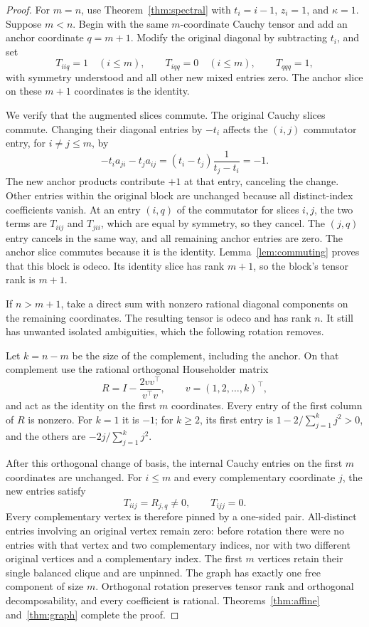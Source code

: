 \begin{proof}
For $m=n$, use Theorem~\ref{thm:spectral} with $t_i=i-1$, $z_i=1$, and $\kappa=1$. Suppose $m<n$. Begin with the same $m$-coordinate Cauchy tensor and add an anchor coordinate $q=m+1$. Modify the original diagonal by subtracting $t_i$, and set
\begin{equation}\label{eq:anchor}
 T_{iiq}=1\quad(i\le m),\qquad T_{iqq}=0\quad(i\le m),\qquad
 T_{qqq}=1,
\end{equation}
with symmetry understood and all other new mixed entries zero. The anchor slice on these $m+1$ coordinates is the identity.

We verify that the augmented slices commute. The original Cauchy slices commute. Changing their diagonal entries by $-t_i$ affects the $(i,j)$ commutator entry, for $i\ne j\le m$, by
\[
 -t_i a_{ji}-t_j a_{ij}
 =(t_i-t_j)\frac{1}{t_j-t_i}=-1.
\]
The new anchor products contribute $+1$ at that entry, canceling the change. Other entries within the original block are unchanged because all distinct-index coefficients vanish. At an entry $(i,q)$ of the commutator for slices $i,j$, the two terms are $T_{iij}$ and $T_{jii}$, which are equal by symmetry, so they cancel. The $(j,q)$ entry cancels in the same way, and all remaining anchor entries are zero. The anchor slice commutes because it is the identity. Lemma~\ref{lem:commuting} proves that this block is odeco. Its identity slice has rank $m+1$, so the block's tensor rank is $m+1$.

If $n>m+1$, take a direct sum with nonzero rational diagonal components on the remaining coordinates. The resulting tensor is odeco and has rank $n$. It still has unwanted isolated ambiguities, which the following rotation removes.

Let $k=n-m$ be the size of the complement, including the anchor. On that complement use the rational orthogonal Householder matrix
\begin{equation}\label{eq:householder}
 R=I-\frac{2vv^\top}{v^\top v},\qquad v=(1,2,\ldots,k)^\top,
\end{equation}
and act as the identity on the first $m$ coordinates. Every entry of the first column of $R$ is nonzero. For $k=1$ it is $-1$; for $k\ge2$, its first entry is $1-2/\sum_{j=1}^k j^2>0$, and the others are $-2j/\sum_{j=1}^k j^2$.

After this orthogonal change of basis, the internal Cauchy entries on the first $m$ coordinates are unchanged. For $i\le m$ and every complementary coordinate $j$, the new entries satisfy
\[
 T_{iij}=R_{j,q}\ne0,\qquad T_{ijj}=0.
\]
Every complementary vertex is therefore pinned by a one-sided pair. All-distinct entries involving an original vertex remain zero: before rotation there were no entries with that vertex and two complementary indices, nor with two different original vertices and a complementary index. The first $m$ vertices retain their single balanced clique and are unpinned. The graph has exactly one free component of size $m$. Orthogonal rotation preserves tensor rank and orthogonal decomposability, and every coefficient is rational. Theorems~\ref{thm:affine} and~\ref{thm:graph} complete the proof.
\end{proof}

